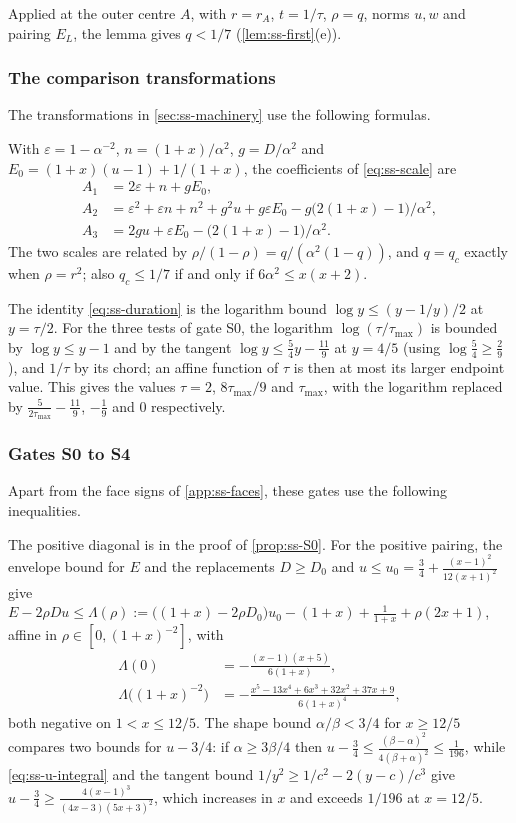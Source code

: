 Applied at the outer centre $A$, with $r=r_A$, $t=1/\tau$, $\rho=q$, norms $u,w$ and pairing
$E_L$, the lemma gives $q<1/7$ (\cref{lem:ss-first}(e)).

\subsubsection{The comparison transformations}\label{app:ss-moves}

The transformations in \cref{sec:ss-machinery} use the following formulas.

 With $\varepsilon=1-\alpha^{-2}$, $n=(1+x)/\alpha^2$,
$g=D/\alpha^2$ and $E_0=(1+x)(u-1)+1/(1+x)$, the coefficients of \eqref{eq:ss-scale} are
\begin{align*}
  A_1&=2\varepsilon+n+gE_0,\\
  A_2&=\varepsilon^2+\varepsilon n+n^2+g^2u+g\varepsilon E_0-g\bigl(2(1+x)-1\bigr)/\alpha^2,\\
  A_3&=2gu+\varepsilon E_0-\bigl(2(1+x)-1\bigr)/\alpha^2.
\end{align*}
The two scales are related by $\rho/(1-\rho)=q/(\alpha^2(1-q))$, and $q=q_c$ exactly when
$\rho=r^2$; also $q_c\le1/7$ if and only if $6\alpha^2\le x(x+2)$.

 The identity \eqref{eq:ss-duration} is the logarithm bound
$\log y\le(y-1/y)/2$ at $y=\tau/2$. For the three tests of gate S0, the logarithm
$\log(\tau/\tau_{\max})$ is bounded by $\log y\le y-1$ and by the tangent
$\log y\le\frac54y-\frac{11}{9}$ at $y=4/5$ (using $\log\frac54\ge\frac29$), and $1/\tau$ by its
chord; an affine function of $\tau$ is then at most its larger endpoint value. This gives the
values $\tau=2$, $8\tau_{\max}/9$ and $\tau_{\max}$, with the logarithm replaced by
$\frac{5}{2\tau_{\max}}-\frac{11}9$, $-\frac19$ and $0$ respectively.

\subsubsection{Gates S0 to S4}\label{app:ss-S0-S4}

Apart from the face signs of \cref{app:ss-faces}, these gates use the following inequalities.

 The positive diagonal is in the proof of \cref{prop:ss-S0}. For the positive
pairing, the envelope bound for $E$ and the replacements $D\ge D_0$ and
$u\le u_0=\frac34+\frac{(x-1)^2}{12(x+1)^2}$ give
$E-2\rho Du\le\Lambda(\rho):=\bigl((1+x)-2\rho D_0\bigr)u_0-(1+x)+\frac1{1+x}+\rho(2x+1)$, affine
in $\rho\in[0,(1+x)^{-2}]$, with
\begin{align*}
  \Lambda(0)&=-\frac{(x-1)(x+5)}{6(1+x)},\\
  \Lambda\bigl((1+x)^{-2}\bigr)&=-\frac{x^5-13x^4+6x^3+32x^2+37x+9}{6(1+x)^4},
\end{align*}
both negative on $1<x\le12/5$. The shape bound $\alpha/\beta<3/4$ for $x\ge12/5$ compares two
bounds for $u-3/4$: if $\alpha\ge3\beta/4$ then
$u-\frac34\le\frac{(\beta-\alpha)^2}{4(\beta+\alpha)^2}\le\frac1{196}$, while
\eqref{eq:ss-u-integral} and the tangent bound $1/y^2\ge1/c^2-2(y-c)/c^3$ give
$u-\frac34\ge\frac{4(x-1)^3}{(4x-3)(5x+3)^2}$, which increases in $x$ and exceeds $1/196$ at
$x=12/5$.

